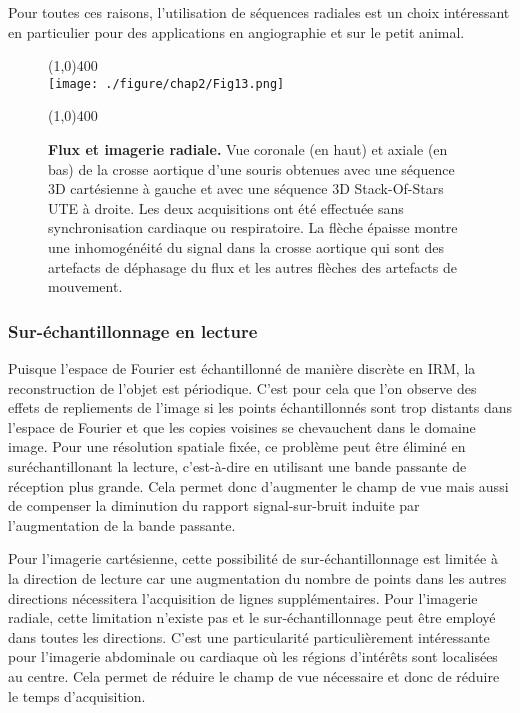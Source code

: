 Pour toutes ces raisons, l'utilisation de séquences radiales est un choix intéressant en particulier pour des applications en angiographie et sur le petit animal. 
\begin{figure}[H]
\centering
\line(1,0){400} \\
\texttt{[image: ./figure/chap2/Fig13.png]}
\caption[Flux et imagerie radiale.]{\label{fig:FluxArt} \textbf{Flux et imagerie radiale.} Vue coronale (en haut) et axiale (en bas) de la crosse aortique d'une souris obtenues avec une séquence 3D cartésienne à gauche et avec une séquence 3D Stack-Of-Stars UTE à droite. Les deux acquisitions ont été effectuée sans synchronisation cardiaque ou respiratoire. La flèche épaisse montre une inhomogénéité du signal dans la crosse aortique qui sont des artefacts de déphasage du flux et les autres flèches  des artefacts de mouvement.}
\line(1,0){400} \\
\end{figure}

\subsubsection{Sur-échantillonnage en lecture}

Puisque l'espace de Fourier est échantillonné de manière discrète en IRM, la reconstruction de l'objet est périodique. C'est pour cela que l'on observe des effets de repliements de l'image si les points échantillonnés sont trop distants dans l'espace de Fourier et que les copies voisines se chevauchent dans le domaine image. Pour une résolution spatiale fixée, ce problème peut être éliminé en suréchantillonant la lecture, c'est-à-dire en utilisant une bande passante de réception plus grande. Cela permet donc d'augmenter le champ de vue mais aussi de compenser la diminution du rapport signal-sur-bruit induite par l'augmentation de la bande passante.

Pour l'imagerie cartésienne, cette possibilité de sur-échantillonnage est limitée à la direction de lecture car une augmentation du nombre de points dans les autres directions nécessitera l'acquisition de lignes supplémentaires. Pour l'imagerie radiale, cette limitation n'existe pas et le sur-échantillonnage peut être employé dans toutes les directions. C'est une particularité particulièrement  intéressante pour l'imagerie abdominale ou cardiaque \cite{block2014towards,Johnson:2012uq} où les régions d'intérêts sont localisées au centre. Cela permet de réduire le champ de vue nécessaire et donc de réduire le temps d'acquisition.

